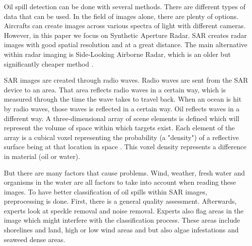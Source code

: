 \hspace{0.5cm} Oil spill detection can be done with several methods. There are different types of data that can be used. In the field of images alone, there are plenty of options. Aircrafts can create images across various spectra of light with different cameras. However, in this paper we focus on Synthetic Aperture Radar. SAR creates radar images with good spatial resolution and at a great distance. The main alternative within radar imaging is Side-Looking Airborne Radar, which is an older but significantly cheaper method \cite{Fingas&Brown2014}. 

SAR images are created through radio waves. Radio waves are sent from the SAR device to an area. That area reflects radio waves in a certain way, which is measured through the time the wave takes to travel back. When an ocean is hit by radio waves, those waves is reflected in a certain way. Oil reflects waves in a different way. A three-dimensional array of scene elements is defined which will represent the volume of space within which targets exist. Each element of the array is a cubical voxel representing the probability (a "density") of a reflective surface being at that location in space \cite{wikireplacethis}. This voxel density represents a difference in material (oil or water).

But there are many factors that cause problems. Wind, weather, fresh water and organisms in the water are all factors to take into account when reading these images. To have better classification of oil spills within SAR images, preprocessing is done. First, there is a general quality assessment. Afterwards, experts look at speckle removal and noise removal\cite{Keramitsoglou2004}. Experts also flag areas in the image which might interfere with the classification process. These areas include shorelines and land, high or low wind areas and but also algae infestations and seaweed dense areas\cite{Fingas&Brown2014}.



